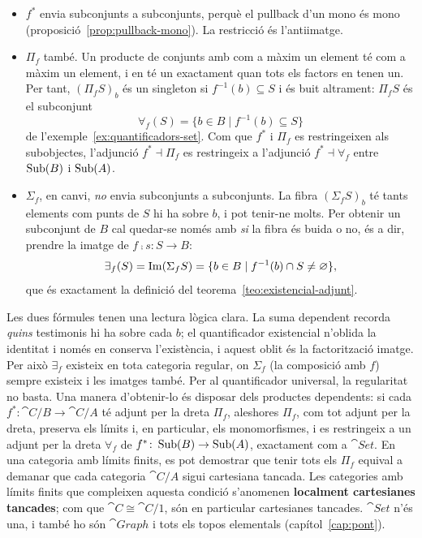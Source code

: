 \begin{itemize}
\item $f^{*}$ envia subconjunts a subconjunts, perquè el pullback d'un mono és mono (proposició~\ref{prop:pullback-mono}). La restricció és l'antiimatge.
\item $\Pi_f$ també. Un producte de conjunts amb com a màxim un element té com a màxim un element, i en té un exactament quan tots els factors en tenen un. Per tant, $(\Pi_f S)_b$ és un singleton si $f^{-1}(b)\subseteq S$ i és buit altrament: $\Pi_f S$ és el subconjunt
\[
\forall_f(S)=\{b\in B\mid f^{-1}(b)\subseteq S\}
\]
de l'exemple~\ref{ex:quantificadors-set}. Com que $f^{*}$ i $\Pi_f$ es restringeixen als subobjectes, l'adjunció $f^{*}\dashv\Pi_f$ es restringeix a l'adjunció $f^{*}\dashv\forall_f$ entre $\operatorname{Sub}(B)$ i $\operatorname{Sub}(A)$.
\item $\Sigma_f$, en canvi, \emph{no} envia subconjunts a subconjunts. La fibra $(\Sigma_f S)_b$ té tants elements com punts de $S$ hi ha sobre $b$, i pot tenir-ne molts. Per obtenir un subconjunt de $B$ cal quedar-se només amb \emph{si} la fibra és buida o no, és a dir, prendre la imatge de $f\comp s\colon S\to B$:
\[
\exists_f(S)=\operatorname{Im}(\Sigma_f S)=\{b\in B\mid f^{-1}(b)\cap S\neq\varnothing\},
\]
que és exactament la definició del teorema~\ref{teo:existencial-adjunt}.
\end{itemize}

Les dues fórmules tenen una lectura lògica clara. La suma dependent recorda \emph{quins} testimonis hi ha sobre cada $b$; el quantificador existencial n'oblida la identitat i només en conserva l'existència, i aquest oblit és la factorització imatge. Per això $\exists_f$ existeix en tota categoria regular, on $\Sigma_f$ (la composició amb $f$) sempre existeix i les imatges també. Per al quantificador universal, la regularitat no basta. Una manera d'obtenir-lo és disposar dels productes dependents: si cada $f^{*}\colon\cat{C}/B\to\cat{C}/A$ té adjunt per la dreta $\Pi_f$, aleshores $\Pi_f$, com tot adjunt per la dreta, preserva els límits i, en particular, els monomorfismes, i es restringeix a un adjunt per la dreta $\forall_f$ de $f^{*}\colon\operatorname{Sub}(B)\to\operatorname{Sub}(A)$, exactament com a $\cat{Set}$. En una categoria amb límits finits, es pot demostrar que tenir tots els $\Pi_f$ equival a demanar que cada categoria $\cat{C}/A$ sigui cartesiana tancada. Les categories amb límits finits que compleixen aquesta condició s'anomenen \textbf{localment cartesianes tancades}; com que $\cat{C}\cong\cat{C}/1$, són en particular cartesianes tancades. $\cat{Set}$ n'és una, i també ho són $\cat{Graph}$ i tots els topos elementals (capítol~\ref{cap:pont}).

